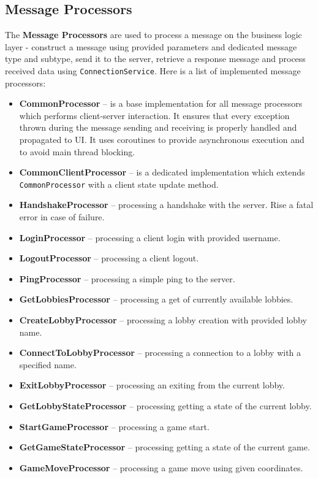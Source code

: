 \documentclass[english, sem, kiv, he, iso690alph, pdf, viewonly]{fasthesis}
\begin{document}
\subsection{Message Processors}
The \textbf{Message Processors} are used to process a message on the business logic layer - construct a message using provided parameters and dedicated message type and subtype, send it to the server, retrieve a response message and process received data using \texttt{ConnectionService}. Here is a list of implemented message processors:

\begin{itemize}
	\item \textbf{CommonProcessor} -- is a base implementation for all message processors which performs client-server interaction.  It ensures that every exception thrown during the message sending and receiving is properly handled and propagated to \ac{UI}. It uses coroutines to provide asynchronous execution and to avoid main thread blocking. 
	\item \textbf{CommonClientProcessor} -- is a dedicated implementation which extends \texttt{CommonProcessor} with a client state update method.
	\item \textbf{HandshakeProcessor} -- processing a handshake with the server. Rise a fatal error in case of failure.
	\item \textbf{LoginProcessor} -- processing a client login with provided username.
	\item \textbf{LogoutProcessor} -- processing a client logout.
	\item \textbf{PingProcessor} -- processing a simple ping to the server.
	\item \textbf{GetLobbiesProcessor} -- processing a get of currently available lobbies.
	\item \textbf{CreateLobbyProcessor} -- processing a lobby creation with provided lobby name.
	\item \textbf{ConnectToLobbyProcessor} -- processing a connection to a lobby with a specified name.
	\item \textbf{ExitLobbyProcessor} -- processing an exiting from the current lobby.
	\item \textbf{GetLobbyStateProcessor} -- processing getting a state of the current lobby.
	\item \textbf{StartGameProcessor} -- processing a game start.
	\item \textbf{GetGameStateProcessor} -- processing getting a state of the current game.
	\item \textbf{GameMoveProcessor} -- processing a game move using given coordinates.
\end{itemize}
\end{document}
